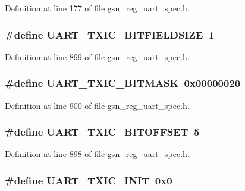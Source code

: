 Definition at line 177 of file gsn\_\-reg\_\-uart\_\-spec.h.

\hypertarget{a00575_a3df30e1b7b6741ed9b9ba3644deabc7b}{
\subsubsection[{UART\_\-TXIC\_\-BITFIELDSIZE}]{\setlength{\rightskip}{0pt plus 5cm}\#define UART\_\-TXIC\_\-BITFIELDSIZE~1}}
\label{a00575_a3df30e1b7b6741ed9b9ba3644deabc7b}


Definition at line 899 of file gsn\_\-reg\_\-uart\_\-spec.h.

\hypertarget{a00575_a76b1256c8fa610b72e1bd0f8c56b0887}{
\subsubsection[{UART\_\-TXIC\_\-BITMASK}]{\setlength{\rightskip}{0pt plus 5cm}\#define UART\_\-TXIC\_\-BITMASK~0x00000020}}
\label{a00575_a76b1256c8fa610b72e1bd0f8c56b0887}


Definition at line 900 of file gsn\_\-reg\_\-uart\_\-spec.h.

\hypertarget{a00575_a349d25bc384d61de5528f66981e32e8a}{
\subsubsection[{UART\_\-TXIC\_\-BITOFFSET}]{\setlength{\rightskip}{0pt plus 5cm}\#define UART\_\-TXIC\_\-BITOFFSET~5}}
\label{a00575_a349d25bc384d61de5528f66981e32e8a}


Definition at line 898 of file gsn\_\-reg\_\-uart\_\-spec.h.

\hypertarget{a00575_a19e9bda2e0c95b22127cb7746fee6b60}{
\subsubsection[{UART\_\-TXIC\_\-INIT}]{\setlength{\rightskip}{0pt plus 5cm}\#define UART\_\-TXIC\_\-INIT~0x0}}
\label{a00575_a19e9bda2e0c95b22127cb7746fee6b60}


